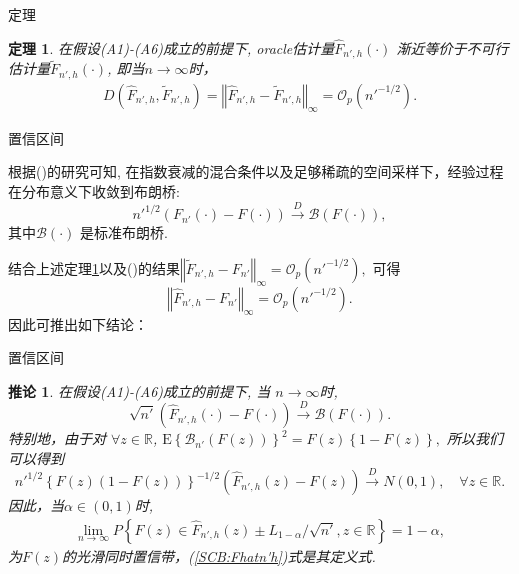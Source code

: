 \documentclass{beamer}
\newtheorem{thm}{定理}
\newtheorem{coro}{推论}
\begin{document}
\begin{frame}{定理\uppercase\expandafter{}}
\begin{thm} \label{THM:FhatFtilde}
在假设(A1)-(A6)成立的前提下, oracle估计量$\hat{F}_{n',h}(\cdot)$ 渐近等价于不可行估计量$\tilde{F}_{n',h}(\cdot)$, 即当$n\to\infty$时，
\begin{align*}
    D\left(\hat{F}_{n',h}, \tilde{F}_{n',h}\right) = \left\Vert\hat{F}_{n',h} - \tilde{F}_{n',h}\right\Vert_{\infty} = {\scriptstyle{\mathcal{O}}}_{p}\left(n'^{-1/2}\right).
\end{align*}
\end{thm}

\end{frame}

\begin{frame}{置信区间}

根据(\cite{fazekas2006asymptotic})的研究可知, 在指数衰减的混合条件以及足够稀疏的空间采样下，经验过程在分布意义下收敛到布朗桥:
\[
n'^{1/2}\left(F_{n'}(\cdot) - F(\cdot)\right) \overset{D}{\rightarrow} \mathcal{B}(F(\cdot)),
\]
其中$\mathcal{B}(\cdot)$ 是标准布朗桥.

结合上述定理\ref{THM:FhatFtilde}以及(\cite{wang2013smooth})的结果$\left\Vert \tilde{F}_{n',h} - F_{n'} \right\Vert_{\infty} = {\scriptstyle{\mathcal{O}}}_{p}\left(n'^{-1/2}\right),$ 
可得
$$\left\Vert \hat{F}_{n',h} - F_{n'} \right\Vert_{\infty} = {\scriptstyle{\mathcal{O}}}_{p}\left(n'^{-1/2}\right).$$
因此可推出如下结论：
\end{frame}


\begin{frame}{置信区间}
    \begin{coro}
  在假设(A1)-(A6)成立的前提下, 当 $n \to \infty$时,
    \[
\sqrt{n'}\left( \hat{F}_{n',h}(\cdot) - F(\cdot) \right) \overset{D}{\rightarrow} \mathcal{B}(F(\cdot)).
\]
特别地，由于对 \( \forall z \in \mathbb{R}\), \(\mathrm{E} \left\{ \mathcal{B}_{n'}(F(z)) \right\}^2 = F(z)\left\{1 - F(z)\right\},\)
所以我们可以得到
\[
n'^{1/2}\left\{ F(z)(1 - F(z)) \right\}^{-1/2} \left( \hat{F}_{n',h}(z) - F(z) \right) \overset{D}{\rightarrow}  N(0,1), \quad \forall z  \in \mathbb{R}.
\]
因此，当$\alpha \in (0,1)$时,
\begin{align*}
    \lim_{n \to \infty}P\left\{F(z) \in \hat{F}_{n',h}(z) \pm L_{1-\alpha}/\sqrt{n'}, z\in  \mathbb{R}\right\}=1-\alpha,
\end{align*}
 为$F(z)$的光滑同时置信带，(\ref{SCB:Fhatn'h})式是其定义式.
\end{coro}
\end{frame}
\end{document}
